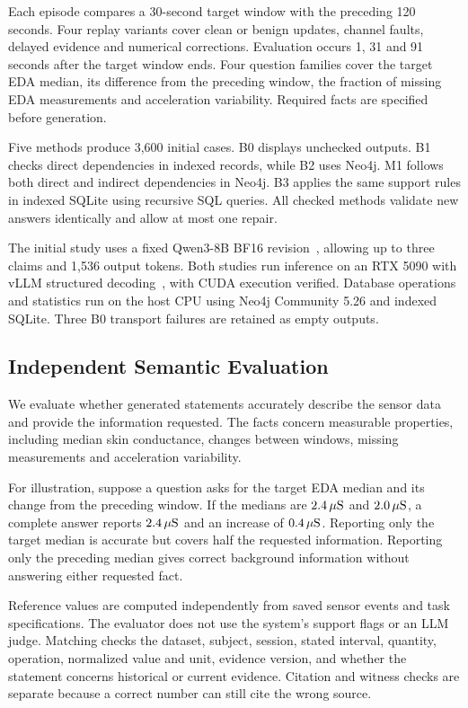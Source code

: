 \documentclass[runningheads]{llncs}
\begin{document}
Each episode compares a 30-second target window with the preceding 120 seconds.
Four replay variants cover clean or benign updates, channel faults, delayed
evidence and numerical corrections. Evaluation occurs 1, 31 and 91 seconds
after the target window ends. Four question families cover the target EDA
median, its difference from the preceding window, the fraction of missing
EDA measurements and acceleration variability. Required facts are specified
before generation.

Five methods produce 3,600 initial cases. B0 displays unchecked outputs.
B1 checks direct dependencies in indexed records, while B2 uses Neo4j.
M1 follows both direct and indirect dependencies in Neo4j. B3 applies the
same support rules in indexed SQLite using recursive SQL queries.
All checked methods validate new answers identically and allow at most
one repair.

The initial study uses a fixed Qwen3-8B BF16 revision~\cite{qwen3}, allowing
up to three claims and 1,536 output tokens. Both studies run inference on an
RTX 5090 with vLLM structured decoding~\cite{vllm}, with CUDA execution
verified. Database operations and statistics run on the host CPU using
Neo4j Community 5.26 and indexed SQLite. Three B0 transport failures are
retained as empty outputs.



\subsection{Independent Semantic Evaluation}

We evaluate whether generated statements accurately describe the sensor data
and provide the information requested. The facts concern measurable properties,
including median skin conductance, changes between windows, missing measurements
and acceleration variability.

For illustration, suppose a question asks for the target EDA median and its
change from the preceding window. If the medians are $2.4\,\mu{\rm S}$ and
$2.0\,\mu{\rm S}$, a complete answer reports $2.4\,\mu{\rm S}$ and an increase
of $0.4\,\mu{\rm S}$. Reporting only the target median is accurate but covers
half the requested information. Reporting only the preceding median gives
correct background information without answering either requested fact.

Reference values are computed independently from saved sensor events and task
specifications. The evaluator does not use the system's support flags or an
LLM judge. Matching checks the dataset, subject, session, stated interval,
quantity, operation, normalized value and unit, evidence version, and whether
the statement concerns historical or current evidence. Citation and witness
checks are separate because a correct number can still cite the wrong source.
\end{document}

